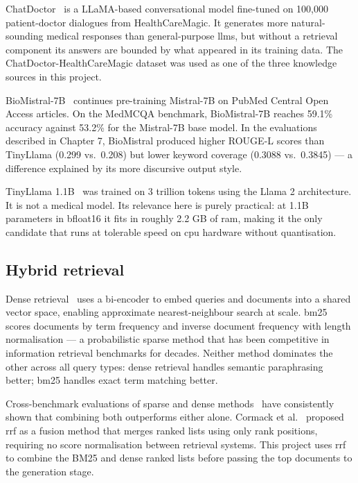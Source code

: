 ChatDoctor~\cite{li2023chatdoctor} is a LLaMA-based conversational model fine-tuned on 100,000 patient-doctor dialogues from HealthCareMagic. It generates more natural-sounding medical responses than general-purpose \ac{llm}s, but without a retrieval component its answers are bounded by what appeared in its training data. The ChatDoctor-HealthCareMagic dataset was used as one of the three knowledge sources in this project.

BioMistral-7B~\cite{labrak2024biomistral} continues pre-training Mistral-7B on PubMed Central Open Access articles. On the MedMCQA benchmark, BioMistral-7B reaches 59.1\% accuracy against 53.2\% for the Mistral-7B base model. In the evaluations described in Chapter 7, BioMistral produced higher ROUGE-L scores than TinyLlama (0.299 vs.\ 0.208) but lower keyword coverage (0.3088 vs.\ 0.3845) --- a difference explained by its more discursive output\allowbreak{} style.

TinyLlama 1.1B~\cite{zhang2024tinyllama} was trained on 3 trillion tokens using the Llama 2 architecture. It is not a medical model. Its relevance here is purely practical: at 1.1B parameters in bfloat16 it fits in roughly 2.2 GB of \ac{ram}, making it the only candidate that runs at tolerable speed on \ac{cpu} hardware without quantisation.

\subsection{Hybrid retrieval}

Dense retrieval~\cite{karpukhin2020dpr} uses a bi-encoder to embed queries and documents into a shared vector space, enabling approximate nearest-neighbour search at scale. \ac{bm25}~\cite{robertson2009bm25} scores documents by term frequency and inverse document frequency with length normalisation --- a probabilistic sparse method that has been competitive in information retrieval benchmarks for decades. Neither method dominates the other across all query types: dense retrieval handles semantic paraphrasing better; \ac{bm25} handles exact term matching better.

Cross-benchmark evaluations of sparse and dense methods~\cite{ma2022hybrid} have consistently shown that combining both outperforms either alone. Cormack et al.~\cite{cormack2009rrf} proposed \ac{rrf} as a fusion method that merges ranked lists using only rank positions, requiring no score normalisation between retrieval systems. This project uses \ac{rrf} to combine the BM25 and dense ranked lists before passing the top documents to the generation stage.

